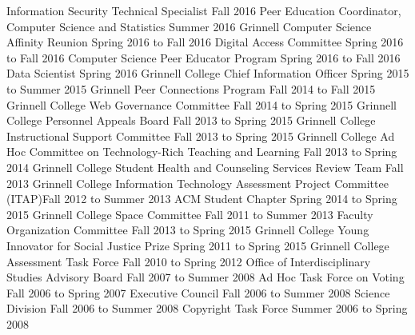 \begin{cventries}
  {Information Security Technical Specialist}
  {Fall 2016}
  {Peer Education Coordinator, Computer Science and Statistics}
  {Summer 2016}
  {Grinnell Computer Science Affinity Reunion}
  {Spring 2016 to Fall 2016}
  {Digital Access Committee}
  {Spring 2016 to Fall 2016}
  {Computer Science Peer Educator Program}
  {Spring 2016 to Fall 2016}
  {Data Scientist}
  {Spring 2016}
  {Grinnell College Chief Information Officer}
  {Spring 2015 to Summer 2015}
  {Grinnell Peer Connections Program}
  {Fall 2014 to Fall 2015}
  {Grinnell College Web Governance Committee}
  {Fall 2014 to Spring 2015}
  {Grinnell College Personnel Appeals Board}
  {Fall 2013 to Spring 2015}
  {Grinnell College Instructional Support Committee}
  {Fall 2013 to Spring 2015}
  {Grinnell College Ad Hoc Committee on Technology-Rich Teaching and Learning}
  {Fall 2013 to Spring 2014}
  {Grinnell College Student Health and Counseling Services Review Team}
  {Fall 2013}
  {Grinnell College Information Technology Assessment Project Committee (ITAP)}{Fall 2012 to Summer 2013}
  {ACM Student Chapter}
  {Spring 2014 to Spring 2015}
  {Grinnell College Space Committee}
  {Fall 2011 to Summer 2013}
  {Faculty Organization Committee}
  {Fall 2013 to Spring 2015}
  {Grinnell College Young Innovator for Social Justice Prize}
  {Spring 2011 to Spring 2015}
  {Grinnell College Assessment Task Force}
  {Fall 2010 to Spring 2012}
  {Office of Interdisciplinary Studies Advisory Board}
  {Fall 2007 to Summer 2008}
  {Ad Hoc Task Force on Voting}
  {Fall 2006 to Spring 2007}
  {Executive Council}
  {Fall 2006 to Summer 2008}
  {Science Division}
  {Fall 2006 to Summer 2008}
  {Copyright Task Force}
  {Summer 2006 to Spring 2008}

\end{cventries}
